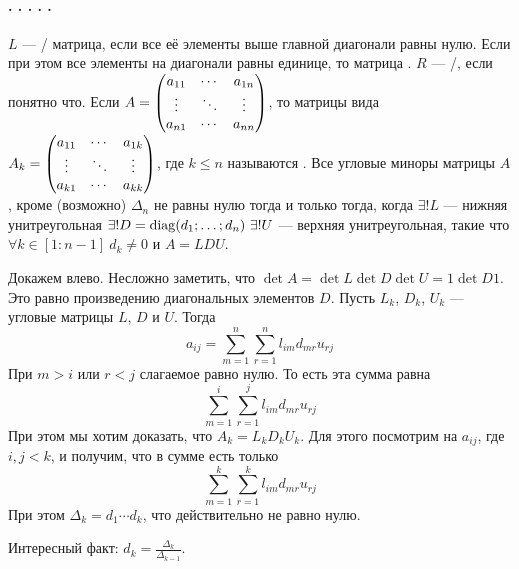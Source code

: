 \documentclass{article}
\begin{document}
    \paragraph{. . . . .}
    \begin{itemize}
        \dfn $L$ --- / матрица, если все её элементы выше главной диагонали равны нулю. Если при этом все элементы на диагонали равны единице, то матрица .
        \dfn $R$ --- /, если понятно что.
        \dfn Если $A=\left(\begin{matrix}
            a_{11} & \cdots & a_{1n}\\
            \vdots & \ddots & \vdots\\
            a_{n1} & \cdots & a_{nn}
        \end{matrix}\right)$, то матрицы вида $A_k=\left(\begin{matrix}
            a_{11} & \cdots & a_{1k}\\
            \vdots & \ddots & \vdots\\
            a_{k1} & \cdots & a_{kk}
        \end{matrix}\right)$, где $k\leqslant n$ называются .
        \thm Все угловые миноры матрицы $A$, кроме (возможно) $\Delta_n$ не равны нулю тогда и только тогда, когда $\exists!L$ --- нижняя унитреугольная $\exists!D=\operatorname{diag}(d_1;\ldots;d_n)~\exists!U$ --- верхняя унитреугольная, такие что $\forall k\in[1:n-1]~d_k\neq0$ и $A=LDU$.
        \begin{Proof}
            Докажем влево. Несложно заметить, что $\det A=\det L\det D\det U=1\det D1$. Это равно произведению диагональных элементов $D$. Пусть $L_k$, $D_k$, $U_k$ --- угловые матрицы $L$, $D$ и $U$. Тогда
            $$
            a_{ij}=\sum\limits_{m=1}^n\sum\limits_{r=1}^nl_{im}d_{mr}u_{rj}
            $$
            При $m>i$ или $r<j$ слагаемое равно нулю. То есть эта сумма равна
            $$
            \sum\limits_{m=1}^i\sum\limits_{r=1}^jl_{im}d_{mr}u_{rj}
            $$
            При этом мы хотим доказать, что $A_k=L_kD_kU_k$. Для этого посмотрим на $a_{ij}$, где $i,j<k$, и получим, что в сумме есть только
            $$
            \sum\limits_{m=1}^k\sum\limits_{r=1}^kl_{im}d_{mr}u_{rj}
            $$
            При этом $\Delta_k=d_1\cdots d_k$, что действительно не равно нулю.
            \begin{Comment}
                Интересный факт: $d_k=\frac{\Delta_k}{\Delta_{k-1}}$.

\end{Comment}
\end{Proof}
\end{itemize}
\end{document}
